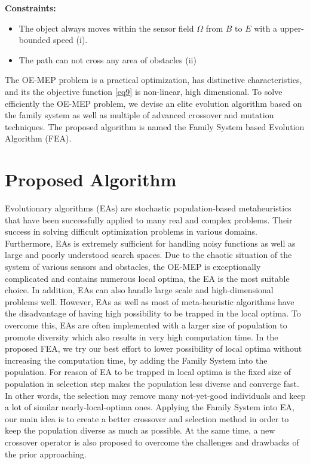 \documentclass[final]{elsarticle}
\begin{document}
\textbf{Constraints:}	
\begin{itemize}
	\item The object always moves within the sensor field $\Omega $ from $B$ to $E$ with a upper-bounded speed (i).
	\item The path can not cross any area of obstacles  (ii)
\end{itemize}
	
The OE-MEP problem is a practical optimization, has distinctive characteristics, and its the objective function \eqref{eq9} is non-linear, high dimensional. To solve efficiently the OE-MEP problem, we devise an elite evolution algorithm based on the family system as well as multiple of advanced crossover and mutation techniques. The proposed algorithm is named the Family System based Evolution Algorithm (FEA).

\section{Proposed Algorithm}
Evolutionary algorithms (EAs) are stochastic population-based metaheuristics that have been successfully applied to many real and complex problems. Their success in solving difficult optimization problems in various domains. Furthermore, EAs is extremely sufficient for handling noisy functions as well as large and poorly understood search spaces. Due to the chaotic situation of the system of various sensors and obstacles, the OE-MEP is exceptionally complicated and contains numerous local optima, the EA is the most suitable choice. In addition, EAs can also handle large scale and high-dimensional problems well. However, EAs as well as most of meta-heuristic algorithms have the disadvantage of having high possibility to be trapped in the local optima. To overcome this, EAs are often implemented with a larger size of population to promote diversity which also results in very high computation time. In the proposed FEA, we try our best effort to lower possibility of local optima without increasing the computation time, by adding the Family System into the population. For reason of EA to be trapped in local optima is the fixed size of population in selection step makes the population less diverse and converge fast. In other words, the selection may remove many not-yet-good individuals and keep a lot of similar nearly-local-optima ones. Applying the Family System into EA, our main idea is to create a better crossover and selection method in order to keep the population diverse as much as possible. At the same time, a new crossover operator is also proposed to overcome the challenges and drawbacks of the prior approaching.
\end{document}

